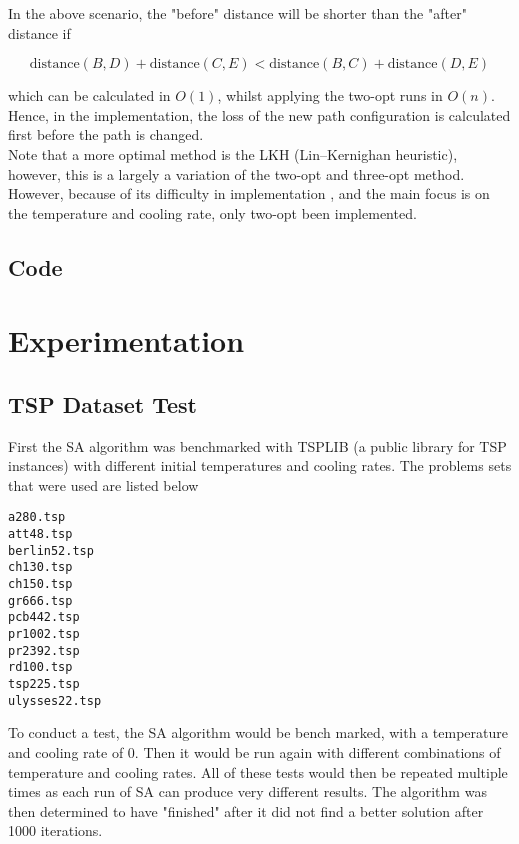 \documentclass{article}
\begin{document}
In the above scenario, the "before" distance will be shorter than the "after" distance if

$$\text{distance}(B, D) + \text{distance}(C, E) < \text{distance}(B, C) + \text{distance}(D, E)$$

which can be calculated in $O(1)$, whilst applying the two-opt runs in $O(n)$.
Hence, in the implementation, the loss of the new path configuration is calculated first before the path is changed. \\

Note that a more optimal method is the LKH (Lin–Kernighan heuristic), however, this is a largely a variation of the two-opt and three-opt method.
However, because of its difficulty in implementation \cite{helsgaun98}, and the main focus is on the temperature and cooling rate, only two-opt been implemented.

\subsection{Code}

\newpage
\section{Experimentation}

\subsection{TSP Dataset Test}
First the SA algorithm was benchmarked with TSPLIB \cite{tsplib} (a public library for TSP instances) with different initial temperatures and cooling rates.
The problems sets that were used are listed below

\begin{multicols}{6}
\begin{verbatim}
a280.tsp
att48.tsp
berlin52.tsp
ch130.tsp
ch150.tsp
gr666.tsp
pcb442.tsp
pr1002.tsp
pr2392.tsp
rd100.tsp
tsp225.tsp
ulysses22.tsp
\end{verbatim}
\end{multicols}

To conduct a test, the SA algorithm would be bench marked, with a temperature and cooling rate of 0.
Then it would be run again with different combinations of temperature and cooling rates.
All of these tests would then be repeated multiple times as each run of SA can produce very different results.
The algorithm was then determined to have "finished" after it did not find a better solution after 1000 iterations.
\\
\end{document}

